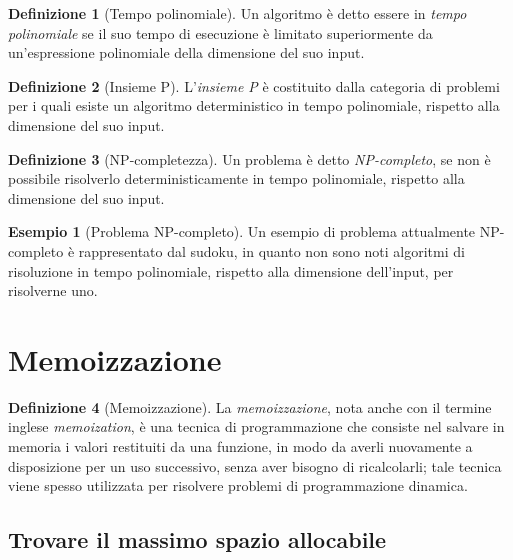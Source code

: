 \documentclass[14pt]{extreport}
\theoremstyle{definition}
\newtheorem{definition}{Definizione}[subsection]
\theoremstyle{definition}
\newtheorem{example}{Esempio}[subsection]
\begin{document}
\begin{definition}[Tempo polinomiale]
    Un algoritmo è detto essere in \textit{tempo polinomiale} se il suo tempo di esecuzione è limitato superiormente da un'espressione polinomiale della dimensione del suo input.
\end{definition}

\begin{definition}[Insieme P]
    L'\textit{insieme P} è costituito dalla categoria di problemi per i quali esiste un algoritmo deterministico in tempo polinomiale, rispetto alla dimensione del suo input.
\end{definition}

\begin{definition}[NP-completezza]
    Un problema è detto \textit{NP-completo}, se non è possibile risolverlo deterministicamente in tempo polinomiale, rispetto alla dimensione del suo input.
\end{definition}

\begin{example}[Problema NP-completo]
    Un esempio di problema attualmente NP-completo è rappresentato dal sudoku, in quanto non sono noti algoritmi di risoluzione in tempo polinomiale, rispetto alla dimensione dell'input, per risolverne uno.
\end{example}

\section{Memoizzazione}

\begin{definition}[Memoizzazione]
    La \textit{memoizzazione}, nota anche con il termine inglese \textit{memoization}, è una tecnica di programmazione che consiste nel salvare in memoria i valori restituiti da una funzione, in modo da averli nuovamente a disposizione per un uso successivo, senza aver bisogno di ricalcolarli; tale tecnica viene spesso utilizzata per risolvere problemi di programmazione dinamica.
\end{definition}

\subsection{Trovare il massimo spazio allocabile}
\end{document}
